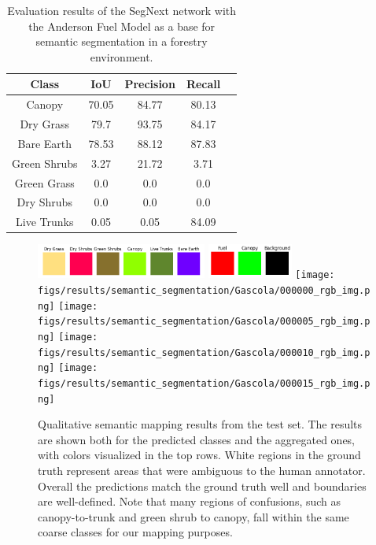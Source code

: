 \begin{table}[ht!]
    \centering
\begin{tabular}{ccccc}
\toprule
\textbf{Class} & \textbf{IoU} & \textbf{Precision} & \textbf{Recall} \\ \midrule
Canopy & 70.05 & 84.77 & 80.13 \\
Dry Grass & 79.7 & 93.75 & 84.17 \\
Bare Earth & 78.53 & 88.12 & 87.83 \\
Green Shrubs & 3.27 & 21.72 & 3.71 \\
Green Grass & 0.0 & 0.0 & 0.0 \\
Dry Shrubs & 0.0 & 0.0 & 0.0 \\
Live Trunks & 0.05 & 0.05 & 84.09 \\
\bottomrule
\end{tabular}
\caption{Evaluation results of the SegNext \cite{} network with the Anderson Fuel Model as a base for semantic segmentation in a forestry environment.}
\label{tab:results:semantic_eval}
\end{table}


\begin{figure}[h!]
   \centering
   \includegraphics[width=0.5\textwidth]{figs/results/semantic_segmentation/Gascola/safeforest_all_classes_flat.png}
   \includegraphics[width=0.25\textwidth]{figs/results/semantic_segmentation/Gascola/safeforest_classmap_compressed_flat.png}
   \texttt{[image: figs/results/semantic\_segmentation/Gascola/000000\_rgb\_img.png]}
   \vspace{0pt}
   \texttt{[image: figs/results/semantic\_segmentation/Gascola/000005\_rgb\_img.png]}
   \vspace{0pt}
   \texttt{[image: figs/results/semantic\_segmentation/Gascola/000010\_rgb\_img.png]}
   \vspace{0pt}
   \texttt{[image: figs/results/semantic\_segmentation/Gascola/000015\_rgb\_img.png]}
   \vspace{0pt}
   \caption{
   Qualitative semantic mapping results from the test set. The results are shown both for the predicted classes and the aggregated ones, with colors visualized in the top rows.
   White regions in the ground truth represent areas that were ambiguous to the human annotator. Overall the predictions match the ground truth well and boundaries are well-defined. Note that many regions of confusions, such as canopy-to-trunk and green shrub to canopy, fall within the same coarse classes for our mapping purposes.
   }
   \label{fig:results:semantic_gascola_qualitative}                %
\end{figure}

